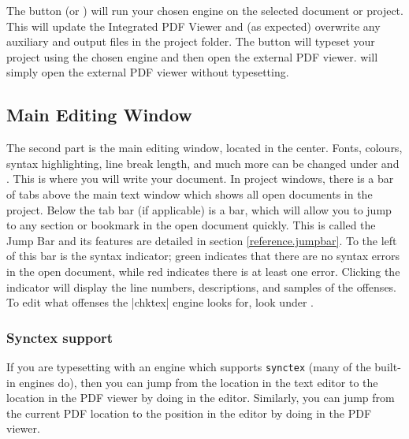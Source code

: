 The  button (or ) will run your chosen engine on the selected document or project. This will update the Integrated PDF Viewer and (as expected) overwrite any auxiliary and output files in the project folder. The  button will typeset your project using the chosen engine and then open the external PDF viewer.  will simply open the external PDF viewer without typesetting.

\subsection{Main Editing Window}

The second part is the main editing window, located in the center. Fonts, colours, syntax highlighting, line break length, and much more can be changed under  and . This is where you will write your document. In project windows, there is a bar of tabs above the main text window which shows all open documents in the project. Below the tab bar (if applicable) is a  bar, which will allow you to jump to any section or bookmark in the open document quickly. This is called the Jump Bar and its features are detailed in section \ref{reference.jumpbar}. To the left of this bar is the syntax indicator; green indicates that there are no syntax errors in the open document, while red indicates there is at least one error. Clicking the indicator will display the line numbers, descriptions, and samples of the offenses. To edit what offenses the |chktex| engine looks for, look under .

\subsubsection{Synctex support}

If you are typesetting with an engine which supports \texttt{synctex} (many of the built-in engines do), then you can jump from the location in the text editor to the location in the PDF viewer by doing  in the editor. Similarly, you can jump from the current PDF location to the position in the editor by doing  in the PDF viewer.

